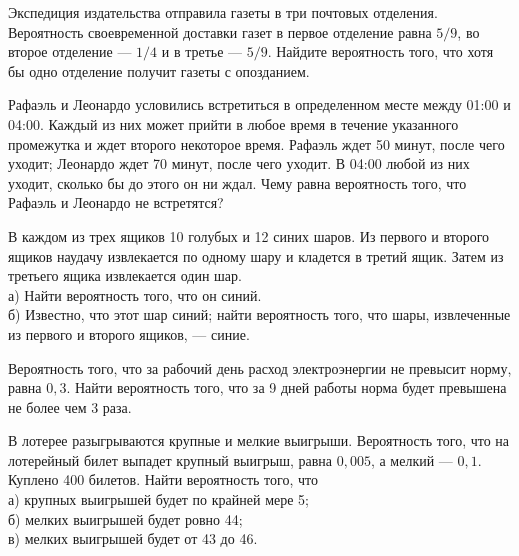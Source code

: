 \newpage\setcounter{zad}{0}



\begin{zkrW}{20}\noindent 
	Экспедиция издательства отправила газеты в три почтовых отделения. Вероятность своевременной доставки газет в первое отделение равна $5/9$, во второе отделение --- $1/4$ и в третье --- $5/9$. Найдите вероятность того, что хотя бы одно отделение получит газеты с опозданием.
 
\end{zkrW}

\begin{zkrW}{20}\noindent 
	Рафаэль и Леонардо условились встретиться в определенном месте между 01:00 и 04:00. Каждый из них может прийти в любое время в течение указанного промежутка и ждет второго некоторое время. Рафаэль ждет 50 минут, после чего уходит; Леонардо ждет 70 минут, после чего уходит. В 04:00 любой из них уходит, сколько бы до этого он ни ждал. Чему равна вероятность того, что Рафаэль и Леонардо не встретятся?
 
\end{zkrW}

\begin{zkrW}{20}\noindent 
	В каждом из трех ящиков 10 голубых и 12 синих шаров. Из первого и второго ящиков наудачу извлекается по одному шару и кладется в третий ящик. Затем из третьего ящика извлекается один шар. \\ \indent а) Найти вероятность того, что он синий. \\ \indent б) Известно, что этот шар синий; найти вероятность того, что шары, извлеченные из первого и второго ящиков, --- синие.
 
\end{zkrW}

\begin{zkrW}{20}\noindent 
	Вероятность того, что за рабочий день расход электроэнергии не превысит норму, равна $0{,}3$. Найти вероятность того, что за 9 дней работы норма будет превышена не более чем 3 раза.
 
\end{zkrW}

\begin{zkrW}{20}\noindent 
	В лотерее разыгрываются крупные и мелкие выигрыши. Вероятность того, что на лотерейный билет выпадет крупный выигрыш, равна $0{,}005$, а мелкий --- $0{,}1$. Куплено 400 билетов. Найти вероятность того, что \\ \indent а) крупных выигрышей будет по крайней мере 5; \\ \indent б) мелких выигрышей будет ровно 44; \\ \indent в) мелких выигрышей будет от 43 до 46.
 
\end{zkrW}

